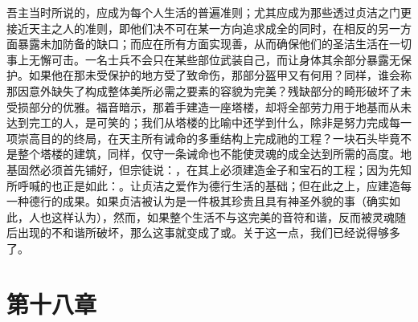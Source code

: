 吾主当时所说的，应成为每个人生活的普遍准则；尤其应成为那些透过贞洁之门更接近天主之人的准则，即他们决不可在某一方向追求成全的同时，在相反的另一方面暴露未加防备的缺口；而应在所有方面实现善，从而确保他们的圣洁生活在一切事上无懈可击。一名士兵不会只在某些部位武装自己，而让身体其余部分暴露无保护。如果他在那未受保护的地方受了致命伤，那部分盔甲又有何用？同样，谁会称那因意外缺失了构成整体美所必需之要素的容貌为完美？残缺部分的畸形破坏了未受损部分的优雅。福音暗示，那着手建造一座塔楼，却将全部劳力用于地基而从未达到完工的人，是可笑的；我们从塔楼的比喻中还学到什么，除非是努力完成每一项崇高目的的终局，在天主所有诫命的多重结构上完成祂的工程？一块石头毕竟不是整个塔楼的建筑，同样，仅守一条诫命也不能使灵魂的成全达到所需的高度。地基固然必须首先铺好，但宗徒说：，在其上必须建造金子和宝石的工程；因为先知所呼喊的也正是如此：。让贞洁之爱作为德行生活的基础；但在此之上，应建造每一种德行的成果。如果贞洁被认为是一件极其珍贵且具有神圣外貌的事（确实如此，人也这样认为），然而，如果整个生活不与这完美的音符和谐，反而被灵魂随后出现的不和谐所破坏，那么这事就变成了或。关于这一点，我们已经说得够多了。\par


\section{第十八章}

